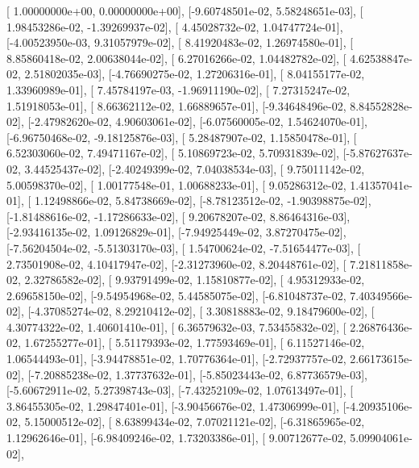 \documentclass{article}
\begin{document}
       [ 1.00000000e+00,  0.00000000e+00],
       [-9.60748501e-02,  5.58248651e-03],
       [ 1.98453286e-02, -1.39269937e-02],
       [ 4.45028732e-02,  1.04747724e-01],
       [-4.00523950e-03,  9.31057979e-02],
       [ 8.41920483e-02,  1.26974580e-01],
       [ 8.85860418e-02,  2.00638044e-02],
       [ 6.27016266e-02,  1.04482782e-02],
       [ 4.62538847e-02,  2.51802035e-03],
       [-4.76690275e-02,  1.27206316e-01],
       [ 8.04155177e-02,  1.33960989e-01],
       [ 7.45784197e-03, -1.96911190e-02],
       [ 7.27315247e-02,  1.51918053e-01],
       [ 8.66362112e-02,  1.66889657e-01],
       [-9.34648496e-02,  8.84552828e-02],
       [-2.47982620e-02,  4.90603061e-02],
       [-6.07560005e-02,  1.54624070e-01],
       [-6.96750468e-02, -9.18125876e-03],
       [ 5.28487907e-02,  1.15850478e-01],
       [ 6.52303060e-02,  7.49471167e-02],
       [ 5.10869723e-02,  5.70931839e-02],
       [-5.87627637e-02,  3.44525437e-02],
       [-2.40249399e-02,  7.04038534e-03],
       [ 9.75011142e-02,  5.00598370e-02],
       [ 1.00177548e-01,  1.00688233e-01],
       [ 9.05286312e-02,  1.41357041e-01],
       [ 1.12498866e-02,  5.84738669e-02],
       [-8.78123512e-02, -1.90398875e-02],
       [-1.81488616e-02, -1.17286633e-02],
       [ 9.20678207e-02,  8.86464316e-03],
       [-2.93416135e-02,  1.09126829e-01],
       [-7.94925449e-02,  3.87270475e-02],
       [-7.56204504e-02, -5.51303170e-03],
       [ 1.54700624e-02, -7.51654477e-03],
       [ 2.73501908e-02,  4.10417947e-02],
       [-2.31273960e-02,  8.20448761e-02],
       [ 7.21811858e-02,  2.32786582e-02],
       [ 9.93791499e-02,  1.15810877e-02],
       [ 4.95312933e-02,  2.69658150e-02],
       [-9.54954968e-02,  5.44585075e-02],
       [-6.81048737e-02,  7.40349566e-02],
       [-4.37085274e-02,  8.29210412e-02],
       [ 3.30818883e-02,  9.18479600e-02],
       [ 4.30774322e-02,  1.40601410e-01],
       [ 6.36579632e-03,  7.53455832e-02],
       [ 2.26876436e-02,  1.67255277e-01],
       [ 5.51179393e-02,  1.77593469e-01],
       [ 6.11527146e-02,  1.06544493e-01],
       [-3.94478851e-02,  1.70776364e-01],
       [-2.72937757e-02,  2.66173615e-02],
       [-7.20885238e-02,  1.37737632e-01],
       [-5.85023443e-02,  6.87736579e-03],
       [-5.60672911e-02,  5.27398743e-03],
       [-7.43252109e-02,  1.07613497e-01],
       [ 3.86455305e-02,  1.29847401e-01],
       [-3.90456676e-02,  1.47306999e-01],
       [-4.20935106e-02,  5.15000512e-02],
       [ 8.63899434e-02,  7.07021121e-02],
       [-6.31865965e-02,  1.12962646e-01],
       [-6.98409246e-02,  1.73203386e-01],
       [ 9.00712677e-02,  5.09904061e-02],
\end{document}
